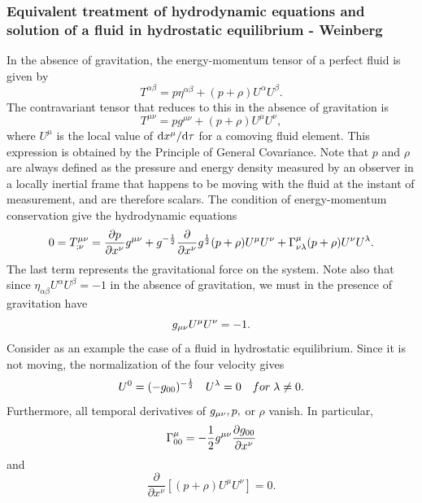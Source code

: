 \subsubsection{Equivalent treatment of hydrodynamic equations and solution of a fluid in hydrostatic equilibrium - Weinberg}
In the absence of gravitation, the energy-momentum tensor of a perfect fluid is given by
\begin{equation}
T^{\alpha \beta} = p \eta^{\alpha \beta} + (p + \rho ) U^\alpha U^\beta. 
\end{equation}
The contravariant tensor that reduces to this in the absence of gravitation is
\begin{equation}
T^{\mu \nu} = p g^{\mu \nu} + (p + \rho) U^\mu U^\nu,
\end{equation}
where $U^\mu$ is the local value of $\mathrm{d} x^\mu/\mathrm{d} \tau$ for a comoving fluid element. This expression is obtained by the Principle of General Covariance. Note that $p$ and $\rho$ are always defined as the pressure and energy density measured by an observer in a locally inertial frame that happens to be moving with the fluid at the instant of measurement, and are therefore scalars. The condition of energy-momentum conservation give the hydrodynamic equations
\begin{equation}
0=T^{\mu \nu}_{;\nu} = \frac{\partial p}{\partial x^\nu} g^{\mu \nu} + g^{- \frac{1}{2}} \frac{\partial}{\partial x^\nu} g^{\frac{1}{2}} (p+\rho) U^\mu U^\nu + \Gamma^\mu_{\nu \lambda} (p +\rho) U^\nu U^\lambda.
\end{equation}
The last term represents the gravitational force on the system. Note also that since $\eta_{\alpha \beta}U^\alpha U^\beta =-1$ in the absence of gravitation, we must in the presence of gravitation have
\begin{equation}
g_{\mu \nu} U^\mu U^\nu =-1.
\end{equation}
Consider as an example the case of a fluid in hydrostatic equilibrium. Since it is not moving, the normalization of the four velocity gives
\begin{equation}
U^0 = (- g_{00})^{- \frac{1}{2}} \quad U^\lambda=0 \quad for \; \lambda\neq 0.
\end{equation}
Furthermore, all temporal derivatives of $g_{\mu \nu}, p,$ or $\rho$ vanish. In particular,
\begin{equation}
\Gamma^\mu_{00} = - \frac{1}{2} g^{\mu \nu} \frac{\partial g_{00}}{\partial x^\nu}
\end{equation}
and
\begin{equation}
\frac{\partial}{\partial x^\nu} \left[(p+\rho) U^\mu U^\nu\right]=0.
\end{equation}
